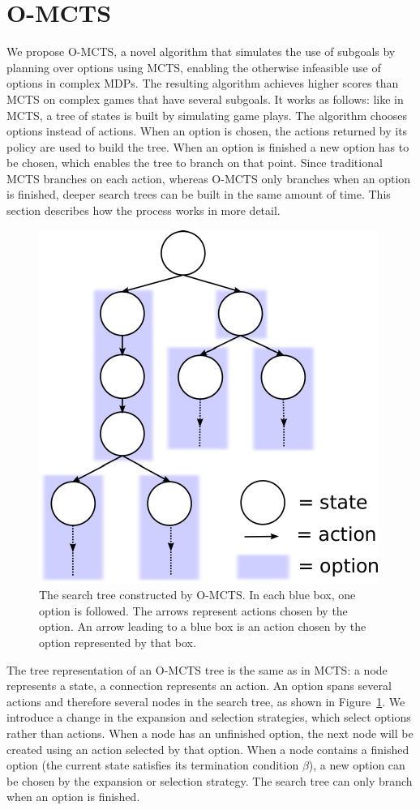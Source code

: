 \section{O-MCTS}
\label{sec:planning}

We propose O-MCTS, a novel algorithm that simulates the use of subgoals by
planning over options using MCTS, enabling the otherwise infeasible use of
options in complex MDPs\@. The resulting algorithm achieves higher scores than
MCTS on complex games that have several subgoals. It works as follows: like in
MCTS, a tree of states is built by simulating game plays. The algorithm chooses
options instead of actions. When an option is chosen, the actions returned by
its policy are used to build the tree. When an option is finished a new option
has to be chosen, which enables the tree to branch on that point. Since
traditional MCTS branches on each action, whereas O-MCTS only branches when an
option is finished, deeper search trees can be built in the same amount of time.
This section describes how the process works in more detail.

\begin{figure}
	\centering
	\includegraphics[width=.4\columnwidth]{includes/omcts-eps-converted-to.pdf}
	\caption{The search tree constructed by O-MCTS\@. In each blue box, one
	option is followed. The arrows represent actions chosen by the option. An
	arrow leading to a blue box is an action chosen by the option represented by
	that box.}
\label{fig:omcts-tree}
\end{figure}


The tree representation of an O-MCTS tree is the same as in MCTS\@: a node
represents a state, a connection represents an action. An option spans several
actions and therefore several nodes in the search tree, as shown in
Figure~\ref{fig:omcts-tree}. We introduce a change in the expansion and
selection strategies, which select options rather than actions. When a node has
an unfinished option, the next node will be created using an action selected by
that option. When a node contains a finished option (the current state satisfies
its termination condition $\beta$), a new option can be chosen by the expansion
or selection strategy. The search tree can only branch when an option is
finished.


